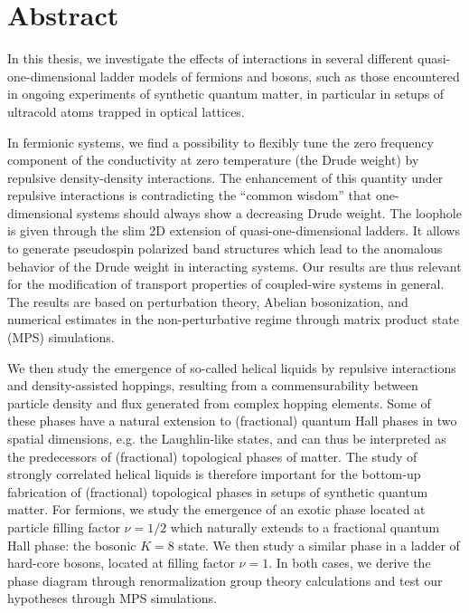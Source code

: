 %
\chapter*{Abstract}
%
In this thesis, we investigate the effects of interactions in several different quasi-one-dimensional ladder models of fermions and bosons, such as those encountered in ongoing experiments of synthetic quantum matter, in particular in setups of ultracold atoms trapped in optical lattices.

In fermionic systems, we find a possibility to flexibly tune the zero frequency component of the conductivity at zero temperature (the Drude weight) by repulsive density-density interactions.
The enhancement of this quantity under repulsive interactions is contradicting the ``common wisdom'' that one-dimensional systems should always show a decreasing Drude weight.
The loophole is given through the slim 2D extension of quasi-one-dimensional ladders.
It allows to generate pseudospin polarized band structures which lead to the anomalous behavior of the Drude weight in interacting systems.
Our results are thus relevant for the modification of transport properties of coupled-wire systems in general.
The results are based on perturbation theory, Abelian bosonization, and numerical estimates in the non-perturbative regime through matrix product state (MPS) simulations.

We then study the emergence of so-called helical liquids by repulsive interactions and density-assisted hoppings, resulting from a commensurability between particle density and flux generated from complex hopping elements.
Some of these phases have a natural extension to (fractional) quantum Hall phases in two spatial dimensions, e.g. the Laughlin-like states, and can thus be interpreted as the predecessors of (fractional) topological phases of matter.
The study of strongly correlated helical liquids is therefore important for the bottom-up fabrication of (fractional) topological phases in setups of synthetic quantum matter.
For fermions, we study the emergence of an exotic phase located at particle filling factor $\nu=1/2$ which naturally extends to a fractional quantum Hall phase: the bosonic $K=8$ state.
We then study a similar phase in a ladder of hard-core bosons, located at filling factor $\nu=1$.
In both cases, we derive the phase diagram through renormalization group theory calculations and test our hypotheses through MPS simulations.

